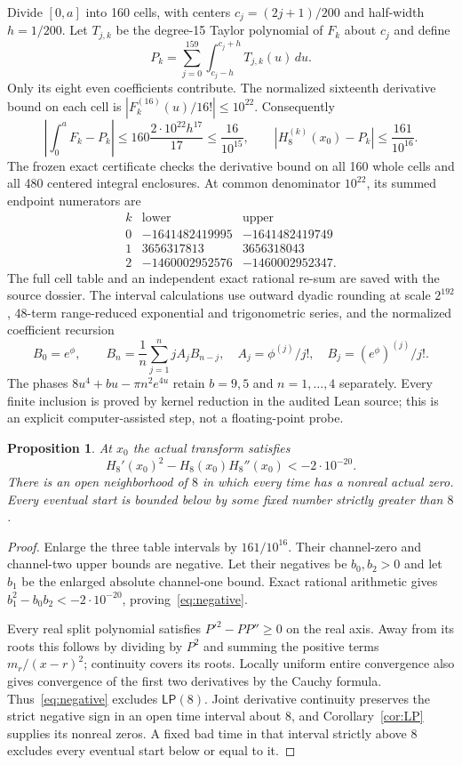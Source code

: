 \documentclass[11pt]{article}
\newtheorem{proposition}[theorem]{Proposition}
\theoremstyle{remark}\newtheorem{remark}[theorem]{Remark}
\begin{document}
Divide $[0,a]$ into 160 cells, with centers $c_j=(2j+1)/200$
and half-width $h=1/200$. Let $T_{j,k}$ be the degree-15
Taylor polynomial of $F_k$ about $c_j$ and define
\[
 P_k=\sum_{j=0}^{159}\int_{c_j-h}^{c_j+h}T_{j,k}(u)\,du.
\]
Only its eight even coefficients contribute. The normalized
sixteenth derivative bound on each cell is
$|F_k^{(16)}(u)/16!|\leq10^{22}$. Consequently
\[
 \left|\int_0^aF_k-P_k\right|
 \leq160\frac{2\cdot10^{22}h^{17}}{17}
 \leq\frac{16}{10^{15}},\qquad
 |H_8^{(k)}(x_0)-P_k|\leq\frac{161}{10^{16}}.
\]
The frozen exact certificate checks the derivative bound on
all 160 whole cells and all 480 centered integral enclosures.
At common denominator $10^{22}$, its summed endpoint
numerators are
\[
\begin{array}{c|rr}
k&\text{lower}&\text{upper}\\\hline
0&-1641482419995&-1641482419749\\
1&3656317813&3656318043\\
2&-1460002952576&-1460002952347.
\end{array}
\]
The full cell table and an independent exact rational re-sum
are saved with the source dossier. The interval calculations
use outward dyadic rounding at scale $2^{192}$, 48-term
range-reduced exponential and trigonometric series, and the
normalized coefficient recursion
\[
 B_0=e^{\phi},\qquad
 B_n=\frac1n\sum_{j=1}^n jA_jB_{n-j},\quad
 A_j=\phi^{(j)}/j!,\quad B_j=(e^\phi)^{(j)}/j!.
\]
The phases $8u^4+bu-\pi n^2e^{4u}$ retain $b=9,5$ and
$n=1,\ldots,4$ separately. Every finite inclusion is proved
by kernel reduction in the audited Lean source; this is an
explicit computer-assisted step, not a floating-point probe.

\begin{proposition}\label{prop:obstruction}
At $x_0$ the actual transform satisfies
\begin{equation}\label{eq:negative}
 H_8'(x_0)^2-H_8(x_0)H_8''(x_0)<-2\cdot10^{-20}.
\end{equation}
There is an open neighborhood of $8$ in which every time has
a nonreal actual zero. Every eventual start is bounded below
by some fixed number strictly greater than $8$.
\end{proposition}
\begin{proof}
Enlarge the three table intervals by $161/10^{16}$. Their
channel-zero and channel-two upper bounds are negative.
Let their negatives be $b_0,b_2>0$ and let $b_1$ be the enlarged
absolute channel-one bound. Exact rational arithmetic gives
$b_1^2-b_0b_2<-2\cdot10^{-20}$, proving~\eqref{eq:negative}.

Every real split polynomial satisfies $P'^2-PP''\geq0$ on
the real axis. Away from its roots this follows by dividing
by $P^2$ and summing the positive terms
$m_r/(x-r)^2$; continuity covers its roots. Locally uniform
entire convergence also gives convergence of the first two
derivatives by the Cauchy formula. Thus~\eqref{eq:negative}
excludes $\mathsf{LP}(8)$. Joint derivative continuity
preserves the strict negative sign in an open time interval
about $8$, and Corollary~\ref{cor:LP} supplies its nonreal zeros.
A fixed bad time in that interval strictly above $8$ excludes
every eventual start below or equal to it.
\end{proof}
\end{document}
